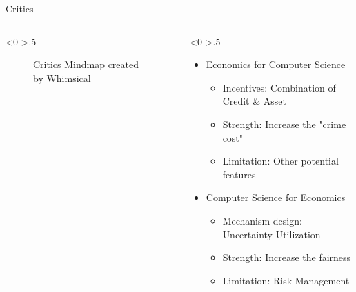 \documentclass{beamer}
\begin{document}
		    \begin{frame}{Critics}
 
		\begin{columns}[T]
			\begin{column}<0->{.5\textwidth}
				\begin{figure}[thpb]
					\centering
					\caption{Critics Mindmap created by Whimsical}
					\label{fig:1}
				\end{figure}
			\end{column}%
			\hfill%
			\begin{column}<0->{.5\textwidth}
				\begin{itemize}
					\item<1-> Economics for Computer Science
					\begin{itemize}
						\item<1-> Incentives: Combination of Credit \& Asset
				\item<1-> Strength: Increase the "crime cost"
				\item<1-> Limitation: Other potential features	\end{itemize}
					\item<2->  Computer Science for Economics
					\begin{itemize}
						\item<2-> Mechanism design: Uncertainty Utilization
							\item<2->Strength: Increase the fairness
								\item<2->Limitation: Risk Management
					\end{itemize}
				\end{itemize}
			\end{column}
		\end{columns}
	\end{frame}		   
			   
			   
			   
\end{document}
